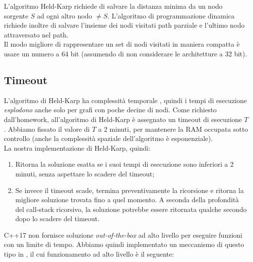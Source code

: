 L'algoritmo Held-Karp richiede di salvare la distanza minima da un nodo sorgente $S$ ad ogni altro nodo $\neq S$. L'algoritmo di programmazione dinamica richiede inoltre di salvare l'insieme dei nodi visitati path parziale e l'ultimo nodo attraversato nel path. \\

\noindent Il modo migliore di rappresentare un set di nodi visitati in maniera compatta è usare un numero a 64 bit (assumendo di non considerare le architetture a 32 bit).

\subsection{Timeout}

\noindent L'algoritmo di Held-Karp ha complessità temporale \complexityHeldKarpTime{}, quindi i tempi di esecuzione \textit{esplodono} anche solo per grafi con poche decine di nodi. Come richiesto dall'homework, all'algoritmo di Held-Karp è assegnato un timeout di esecuzione $T$. Abbiamo fissato il valore di $T$ a 2 minuti, per mantenere la RAM occupata sotto controllo (anche la complessità spaziale dell'algoritmo è esponenziale).\\

\noindent La nostra implementazione di Held-Karp, quindi:

\begin{enumerate}
    \item Ritorna la soluzione esatta se i suoi tempi di esecuzione sono inferiori a 2 minuti, senza aspettare lo scadere del timeout;
    \item Se invece il timeout scade, termina preventivamente la ricorsione e ritorna la migliore soluzione trovata fino a quel momento. A seconda della profondità del call-stack ricorsivo, la soluzione potrebbe essere ritornata qualche secondo dopo lo scadere del timeout.
\end{enumerate}

\noindent C++17 non fornisce soluzione \textit{out-of-the-box} ad alto livello per eseguire funzioni con un limite di tempo. Abbiamo quindi implementato un meccanismo di questo tipo in , il cui funzionamento ad alto livello è il seguente:

